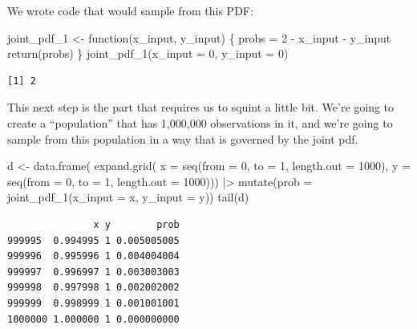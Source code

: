 \documentclass[
  letterpaper,
  DIV=11,
  numbers=noendperiod]{scrreprt}
\newenvironment{Shaded}{\begin{snugshade}}{\end{snugshade}}
\newcommand{\AttributeTok}[1]{\textcolor[rgb]{0.40,0.45,0.13}{#1}}
\newcommand{\ControlFlowTok}[1]{\textcolor[rgb]{0.00,0.23,0.31}{#1}}
\newcommand{\DecValTok}[1]{\textcolor[rgb]{0.68,0.00,0.00}{#1}}
\newcommand{\FunctionTok}[1]{\textcolor[rgb]{0.28,0.35,0.67}{#1}}
\newcommand{\NormalTok}[1]{\textcolor[rgb]{0.00,0.23,0.31}{#1}}
\newcommand{\OtherTok}[1]{\textcolor[rgb]{0.00,0.23,0.31}{#1}}
\newcommand{\SpecialCharTok}[1]{\textcolor[rgb]{0.37,0.37,0.37}{#1}}
\begin{document}
We wrote code that would sample from this PDF:

\begin{Shaded}
\begin{Highlighting}[]
\NormalTok{joint\_pdf\_1 }\OtherTok{\textless{}{-}} \ControlFlowTok{function}\NormalTok{(x\_input, y\_input) \{ }
\NormalTok{  probs }\OtherTok{=} \DecValTok{2} \SpecialCharTok{{-}}\NormalTok{ x\_input }\SpecialCharTok{{-}}\NormalTok{ y\_input}
  \FunctionTok{return}\NormalTok{(probs)}
\NormalTok{\}}
\FunctionTok{joint\_pdf\_1}\NormalTok{(}\AttributeTok{x\_input =} \DecValTok{0}\NormalTok{, }\AttributeTok{y\_input =} \DecValTok{0}\NormalTok{)}
\end{Highlighting}
\end{Shaded}

\begin{verbatim}
[1] 2
\end{verbatim}

This next step is the part that requires us to squint a little bit.
We're going to create a ``population'' that has 1,000,000 observations
in it, and we're going to sample from this population in a way that is
governed by the joint pdf.

\begin{Shaded}
\begin{Highlighting}[]
\NormalTok{d }\OtherTok{\textless{}{-}} \FunctionTok{data.frame}\NormalTok{(}
  \FunctionTok{expand.grid}\NormalTok{(}
    \AttributeTok{x =} \FunctionTok{seq}\NormalTok{(}\AttributeTok{from =} \DecValTok{0}\NormalTok{, }\AttributeTok{to =} \DecValTok{1}\NormalTok{, }\AttributeTok{length.out =} \DecValTok{1000}\NormalTok{), }
    \AttributeTok{y =} \FunctionTok{seq}\NormalTok{(}\AttributeTok{from =} \DecValTok{0}\NormalTok{, }\AttributeTok{to =} \DecValTok{1}\NormalTok{, }\AttributeTok{length.out =} \DecValTok{1000}\NormalTok{))) }\SpecialCharTok{|\textgreater{}} 
  \FunctionTok{mutate}\NormalTok{(}\AttributeTok{prob =} \FunctionTok{joint\_pdf\_1}\NormalTok{(}\AttributeTok{x\_input =}\NormalTok{ x, }\AttributeTok{y\_input =}\NormalTok{ y))}
\FunctionTok{tail}\NormalTok{(d)}
\end{Highlighting}
\end{Shaded}

\begin{verbatim}
               x y        prob
999995  0.994995 1 0.005005005
999996  0.995996 1 0.004004004
999997  0.996997 1 0.003003003
999998  0.997998 1 0.002002002
999999  0.998999 1 0.001001001
1000000 1.000000 1 0.000000000
\end{verbatim}
\end{document}
